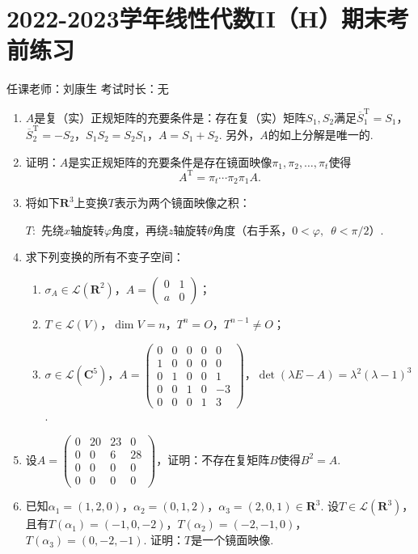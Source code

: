 \section{2022-2023学年线性代数II（H）期末考前练习}

\begin{center}
    任课老师：刘康生\hspace{4em} 考试时长：无
\end{center}

\begin{enumerate}
    \item $A$是复（实）正规矩阵的充要条件是：存在复（实）矩阵$S_1,S_2$满足$\overline{S}_1^{\mathrm{T}}=S_1$，$\overline{S}_2^{\mathrm{T}}=-S_2$，$S_1S_2=S_2S_1$，$A=S_1+S_2$. 另外，$A$的如上分解是唯一的.
	\item 证明：$A$是实正规矩阵的充要条件是存在镜面映像$\pi_1,\pi_2,\ldots,\pi_t$使得
    \[A^\mathrm{T}=\pi_t\cdots\pi_2\pi_1A.\]
	\item 将如下$\mathbf{R}^3$上变换$T$表示为两个镜面映像之积：

    $T\colon$ 先绕$x$轴旋转$\varphi$角度，再绕$z$轴旋转$\theta$角度（右手系，$0<\varphi,\enspace\theta < {\pi}/{2}$）.
	\item 求下列变换的所有不变子空间：
	\begin{enumerate}
        \item $\sigma_A\in\mathcal{L}(\mathbf{R}^2)$，$A=\begin{pmatrix}
            0 & 1 \\ a & 0
        \end{pmatrix}$；

        \item $T\in\mathcal{L}(V)$，$\dim V=n$，$T^n=O$，$T^{n-1}\neq O$；

        \item $\sigma\in\mathcal{L}(\mathbf{C}^5)$，$A=\begin{pmatrix}
            0 & 0 & 0 & 0 & 0 \\ 1 & 0 & 0 & 0 & 0 \\ 0 & 1 & 0 & 0 & 1 \\ 0 & 0 & 1 & 0 & -3 \\ 0 & 0 & 0 & 1 & 3
        \end{pmatrix}$，$\det(\lambda E-A)=\lambda^2(\lambda-1)^3$.
    \end{enumerate}
	\item 设$A=\begin{pmatrix}
        0 & 20 & 23 & 0 \\ 0 & 0 & 6 & 28 \\ 0 & 0 & 0 & 0 \\ 0 & 0 & 0 & 0
    \end{pmatrix}$，证明：不存在复矩阵$B$使得$B^2=A$.
	\item 已知$\alpha_1=(1,2,0)$，$\alpha_2=(0,1,2)$，$\alpha_3=(2,0,1)\in\mathbf{R}^3$. 设$T\in\mathcal{L}(\mathbf{R}^3)$，且有$T(\alpha_1)=(-1,0,-2)$，$T(\alpha_2)=(-2,-1,0)$，$T(\alpha_3)=(0,-2,-1)$. 证明：$T$是一个镜面映像.


\end{enumerate}
